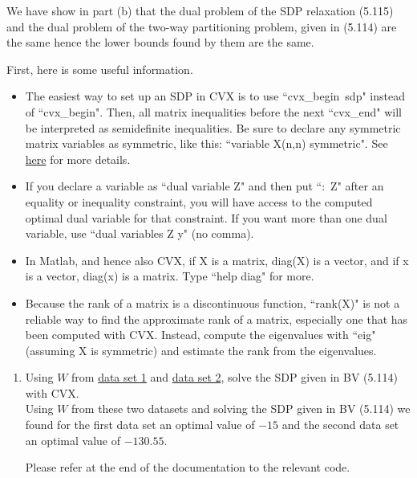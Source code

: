 \documentclass[11pt]{article}
\begin{document}
\begin{enumerate}
	We have show in part (b) that the dual problem of the SDP relaxation  (5.115)  and the dual problem of the two-way partitioning problem, given in (5.114)
	are the same hence the lower bounds found by them are the same.
	
\ee


First, here is some useful information.
\begin{itemize}
\item The easiest way to set up an SDP in CVX is to use \mbox{``cvx\_begin sdp"} instead of \mbox{``cvx\_begin"}. Then, all matrix inequalities
 before the next ``cvx\_end" will be interpreted as semidefinite inequalities. Be sure to declare any symmetric matrix variables as symmetric, like this:
 ``variable X(n,n) symmetric". See
 \href{http://cvxr.com/cvx/doc/sdp.html}{here} for more details.
 \item If you declare a variable as ``dual variable Z" and then put \mbox{``: Z"} after an equality or inequality
 constraint, you will have access to the computed optimal dual variable for that constraint. If you want more
 than one dual variable, use ``dual variables Z y" (no comma).
 \item In {\sc Matlab}, and hence also CVX, if X is a matrix, diag(X) is a vector, and if x is a vector, diag(x) is a matrix. Type ``help diag" for more.
 \item Because the rank of a matrix is a discontinuous function, ``rank(X)" is not a reliable way to find the approximate rank of a matrix, especially one that has been computed with CVX. Instead, compute the eigenvalues with ``eig" (assuming X is symmetric) and estimate the rank from the
 eigenvalues.
 \end{itemize}

\begin{enumerate}
\item Using  $W$ from \href{http://www.cs.nyu.edu/overton/conv_ns_opt/hw/hw4data1.mat}{data set 1} and
 \href{http://www.cs.nyu.edu/overton/conv_ns_opt/hw/hw4data2.mat}{data set 2}, solve the SDP given in BV (5.114) with CVX.\\
 
 \medskip
 Using $W$ from these two datasets and solving the SDP given in BV (5.114) we found for  the first data set an optimal value of $-15$
 and the second data set an optimal value of $-130.55$.
 
 Please refer at the end of the documentation to the relevant code.
 
 \medskip
 

\end{enumerate}
\end{enumerate}
\end{document}
